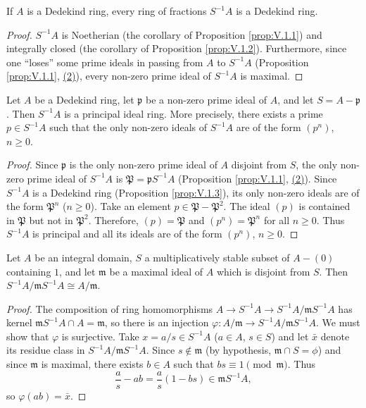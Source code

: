 \begin{proposition}
\label{prop:V.1.3}
If $A$ is a Dedekind ring, every ring of fractions $S^{-1}A$ is a Dedekind
ring.
\end{proposition}

\begin{proof}
$S^{-1}A$ is Noetherian (the corollary of Proposition \ref{prop:V.1.1}) and
integrally closed (the corollary of Proposition \ref{prop:V.1.2}).
Furthermore, since one ``loses'' some prime ideals in passing from $A$ to
$S^{-1}A$ (Proposition \ref{prop:V.1.1}, \hyperref[prop:V.1.1.2]{(2)}), every non-zero prime ideal of
$S^{-1}A$ is maximal.
\end{proof}

\begin{proposition}
\label{prop:V.1.4}
Let $A$ be a Dedekind ring, let $\mathfrak{p}$ be a non-zero prime ideal of
$A$, and let $S=A-\mathfrak{p}$. Then $S^{-1}A$ is a principal ideal ring.
More precisely, there exists a prime $p\in S^{-1}A$ such that the only
non-zero ideals of $S^{-1}A$ are of the form $(p^{n})$, $n\geq0$.
\end{proposition}

\begin{proof}
Since $\mathfrak{p}$ is the only non-zero prime ideal of $A$ disjoint from
$S$, the only non-zero prime ideal of $S^{-1}A$ is
$\mathfrak{P}=\mathfrak{p}S^{-1}A$ (Proposition \ref{prop:V.1.1}, \hyperref[prop:V.1.1.2]{(2)}).
Since $S^{-1}A$ is a Dedekind ring (Proposition \ref{prop:V.1.3}), its only
non-zero ideals are of the form $\mathfrak{P}^{n}$ ($n\geq0$). Take an
element $p\in\mathfrak{P}-\mathfrak{P}^{2}$. The ideal $(p)$ is contained in
$\mathfrak{P}$ but not in $\mathfrak{P}^{2}$. Therefore,
$(p)=\mathfrak{P}$ and $(p^{n})=\mathfrak{P}^{n}$ for all $n\geq0$. Thus
$S^{-1}A$ is principal and all its ideals are of the form $(p^{n})$,
$n\geq0$.
\end{proof}

\begin{proposition}
\label{prop:V.1.5}
Let $A$ be an integral domain, $S$ a multiplicatively stable subset of
$A-(0)$ containing $1$, and let $\mathfrak{m}$ be a maximal ideal of $A$
which is disjoint from $S$. Then $S^{-1}A/\mathfrak{m}S^{-1}A\cong A/\mathfrak{m}$.
\end{proposition}

\begin{proof}
The composition of ring homomorphisms
$A\to S^{-1}A\to S^{-1}A/\mathfrak{m}S^{-1}A$ has kernel
$\mathfrak{m}S^{-1}A\cap A=\mathfrak{m}$, so there is an injection
$\varphi:A/\mathfrak{m}\to S^{-1}A/\mathfrak{m}S^{-1}A$. We must show that
$\varphi$ is surjective. Take $x=a/s\in S^{-1}A$ ($a\in A$, $s\in S$) and let
$\bar x$ denote its residue class in $S^{-1}A/\mathfrak{m}S^{-1}A$. Since
$s\notin\mathfrak{m}$ (by hypothesis, $\mathfrak{m}\cap S=\phi$) and since
$\mathfrak{m}$ is maximal, there exists $b\in A$ such that
$bs\equiv1\pmod{\mathfrak{m}}$. Thus
\[
\frac{a}{s}-ab=\frac{a}{s}(1-bs)\in\mathfrak{m}S^{-1}A,
\]
so $\varphi(ab)=\bar x$.
\end{proof}


